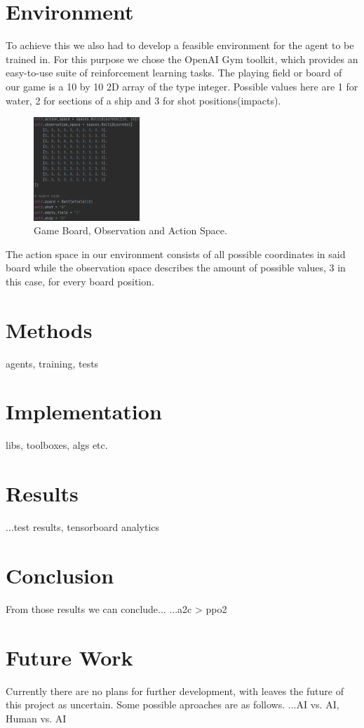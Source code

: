 \documentclass[sigconf]{acmart}
\begin{document}
\section{Environment}
To achieve this we also had to develop a feasible environment for the agent to be trained in. For this purpose we chose the OpenAI Gym toolkit, which provides an easy-to-use suite of reinforcement learning tasks.
The playing field or board of our game is a 10 by 10 2D array of the type integer. Possible values here are 1 for water, 2 for sections of a ship and 3 for shot positions(impacts).

\vspace{5mm} %

\begin{figure}
 \includegraphics[width=40mm]{spaces.png}
  \caption{Game Board, Observation and Action Space.}
  \label{fig:spaces}
\end{figure}

The action space in our environment consists of all possible coordinates in said board while the observation space describes the amount of possible values, 3 in this case, for every board position.

\vfill %

\section{Methods}
 agents, training, tests

\section{Implementation}
 libs, toolboxes, algs etc.
 
 \section{Results}
 ...test results, tensorboard analytics
 
 \section{Conclusion}
   From those results we can conclude...
  ...a2c > ppo2
  
  \section{Future Work}
Currently there are no plans for further development, with leaves the future of  this project as uncertain. Some possible aproaches are as follows. 
...AI vs. AI, Human vs. AI
\end{document}
